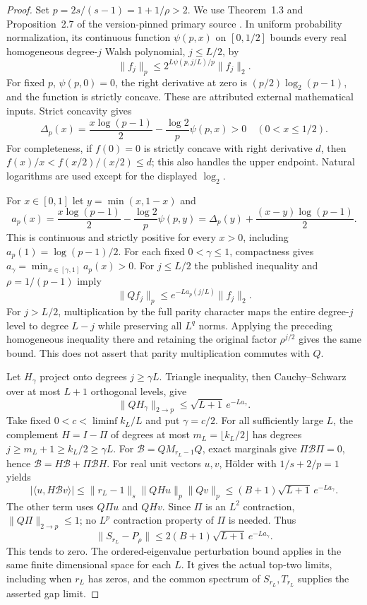 \begin{proof}
Set $p=2s/(s-1)=1+1/\rho>2$. We use Theorem~1.3 and
Proposition~2.7 of the version-pinned primary source
\cite{kirshner-samorodnitsky}. In uniform probability normalization, its
continuous function $\psi(p,x)$ on $[0,1/2]$ bounds every real homogeneous
degree-$j$ Walsh polynomial, $j\leq L/2$, by
\[
 \|f_j\|_p\leq2^{L\psi(p,j/L)/p}\|f_j\|_2.
\]
For fixed $p$, $\psi(p,0)=0$, the right derivative at zero is
$(p/2)\log_2(p-1)$, and the function is strictly concave.
These are attributed external mathematical inputs. Strict concavity gives
\[
 \Delta_p(x)=\frac{x\log(p-1)}2-
 \frac{\log2}{p}\psi(p,x)>0\quad(0<x\leq1/2).
\]
For completeness, if $f(0)=0$ is strictly concave with right derivative
$d$, then $f(x)/x<f(x/2)/(x/2)\leq d$; this also handles the upper
endpoint. Natural logarithms are used except for the displayed $\log_2$.

For $x\in[0,1]$ let $y=\min(x,1-x)$ and
\[
 a_p(x)=\frac{x\log(p-1)}2-\frac{\log2}{p}\psi(p,y)
 =\Delta_p(y)+\frac{(x-y)\log(p-1)}2.
\]
This is continuous and strictly positive for every $x>0$, including
$a_p(1)=\log(p-1)/2$. For each fixed $0<\gamma\leq1$, compactness gives
$a_\gamma=\min_{x\in[\gamma,1]}a_p(x)>0$.
For $j\leq L/2$ the published inequality and $\rho=1/(p-1)$ imply
\[
 \|Qf_j\|_p\leq e^{-La_p(j/L)}\|f_j\|_2.
\]
For $j>L/2$, multiplication by the full parity character maps the entire
degree-$j$ level to degree $L-j$ while preserving all $L^q$ norms.
Applying the preceding homogeneous inequality there and retaining the
original factor $\rho^{j/2}$ gives the same bound. This does not assert
that parity multiplication commutes with $Q$.

Let $H_\gamma$ project onto degrees $j\geq\gamma L$. Triangle inequality,
then Cauchy--Schwarz over at most $L+1$ orthogonal levels, give
\begin{equation}\label{eq:high-level-endpoint-322}
 \|QH_\gamma\|_{2\to p}\leq\sqrt{L+1}\,e^{-La_\gamma}.
\end{equation}
Take fixed $0<c<\liminf k_L/L$ and put $\gamma=c/2$. For all sufficiently
large $L$, the complement $H=I-\Pi$ of degrees at most
$m_L=\lfloor k_L/2\rfloor$ has degrees
$j\geq m_L+1\geq k_L/2\geq\gamma L$.
For $\mathcal B=QM_{r_L-1}Q$, exact marginals give $\Pi\mathcal B\Pi=0$,
hence $\mathcal B=H\mathcal B+\Pi\mathcal BH$.
For real unit vectors $u,v$, H\"older with $1/s+2/p=1$ yields
\[
 |\langle u,H\mathcal Bv\rangle|
 \leq\|r_L-1\|_s\|QHu\|_p\|Qv\|_p
 \leq(B+1)\sqrt{L+1}\,e^{-La_\gamma}.
\]
The other term uses $Q\Pi u$ and $QHv$. Since $\Pi$ is an $L^2$
contraction, $\|Q\Pi\|_{2\to p}\leq1$; no $L^p$ contraction property
of $\Pi$ is needed. Thus
\[
 \|S_{r_L}-P_\rho\|\leq2(B+1)\sqrt{L+1}\,e^{-La_\gamma}.
\]
This tends to zero. The ordered-eigenvalue perturbation bound applies in
the same finite dimensional space for each $L$. It gives the actual
top-two limits, including when $r_L$ has zeros, and the common spectrum
of $S_{r_L},T_{r_L}$ supplies the asserted gap limit.
\end{proof}

